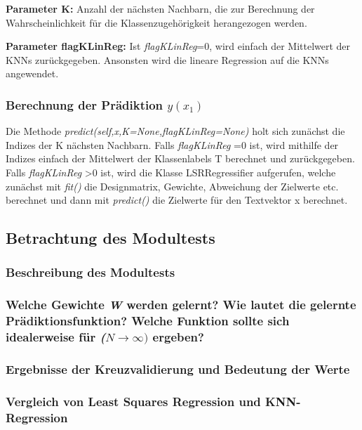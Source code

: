 \noindent
\textbf{Parameter K:} Anzahl der nächsten Nachbarn, die zur Berechnung der Wahrscheinlichkeit für die Klassenzugehörigkeit herangezogen werden.  

\noindent
\textbf{Parameter flagKLinReg:} Ist \textit{flagKLinReg}=0, wird einfach der Mittelwert der KNNs zurückgegeben.
Ansonsten wird die lineare Regression auf die KNNs angewendet. 

\subsubsection{ Berechnung der Prädiktion \textit{$y(x_1)$} }

\noindent
 \vspace{0px}
Die Methode \textit{predict(self,x,K=None,flagKLinReg=None)} holt sich zunächst die Indizes der K nächsten Nachbarn. 
Falls \textit{ flagKLinReg }=0 ist, wird mithilfe der Indizes einfach der Mittelwert der Klassenlabels T berechnet und zurückgegeben. 
Falls \textit{ flagKLinReg }>0 ist, wird die Klasse LSRRegressifier aufgerufen, welche zunächst mit \textit{ fit() } die Designmatrix, Gewichte, Abweichung der Zielwerte etc. berechnet und dann mit \textit{ predict() } die Zielwerte für den Textvektor x berechnet. 

\subsection{Betrachtung des Modultests}

\subsubsection{Beschreibung des Modultests}

\subsubsection{Welche Gewichte \textit{W} werden gelernt? Wie lautet die gelernte Prädiktionsfunktion? Welche Funktion sollte sich idealerweise für \textit{($N \rightarrow \infty)$} ergeben?}

\subsubsection{ Ergebnisse der Kreuzvalidierung und Bedeutung der Werte }

\subsubsection{ Vergleich von Least Squares Regression und KNN-Regression }
